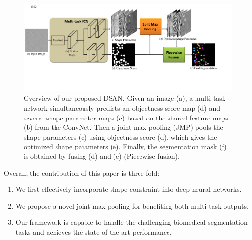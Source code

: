 \begin{figure}
    \begin{center}
        \includegraphics[width=6.7in]{figures/FigDSAN.pdf}
    \end{center}
    \caption{Overview of our proposed DSAN. Given an image (a), a multi-task network simultaneously predicts an objectness score map (d) and several shape parameter maps (c) based on the shared feature maps (b) from the ConvNet.
    Then a joint max pooling (JMP) pools the shape parameters (c) using objectness score (d), which gives the optimized shape parameters (e).
    Finally, the segmentation mask (f) is obtained by fusing (d) and (e) (Piecewise fusion).}
    \label{FigDSAN}
\end{figure}
Overall, the contribution of this paper is three-fold:
\begin{enumerate}
	\item We first effectively incorporate shape constraint into deep neural networks.
	\item We propose a novel joint max pooling for benefiting both multi-task outputs.
	\item Our framework is capable to handle the challenging biomedical segmentation tasks and achieves the state-of-the-art performance.
\end{enumerate}
